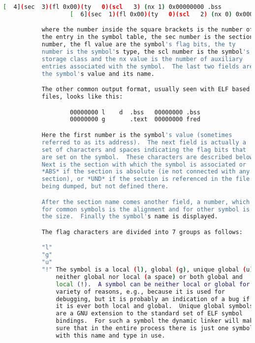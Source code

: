 {{\begin{lstlisting}[language=bash]
                   [  4](sec  3)(fl 0x00)(ty   0)(scl   3) (nx 1) 0x00000000 .bss
                   [  6](sec  1)(fl 0x00)(ty   0)(scl   2) (nx 0) 0x00000000 fred

           where the number inside the square brackets is the number of
           the entry in the symbol table, the sec number is the section
           number, the fl value are the symbol's flag bits, the ty
           number is the symbol's type, the scl number is the symbol's
           storage class and the nx value is the number of auxiliary
           entries associated with the symbol.  The last two fields are
           the symbol's value and its name.

           The other common output format, usually seen with ELF based
           files, looks like this:

                   00000000 l    d  .bss   00000000 .bss
                   00000000 g       .text  00000000 fred

           Here the first number is the symbol's value (sometimes
           referred to as its address).  The next field is actually a
           set of characters and spaces indicating the flag bits that
           are set on the symbol.  These characters are described below.
           Next is the section with which the symbol is associated or
           *ABS* if the section is absolute (ie not connected with any
           section), or *UND* if the section is referenced in the file
           being dumped, but not defined there.

           After the section name comes another field, a number, which
           for common symbols is the alignment and for other symbol is
           the size.  Finally the symbol's name is displayed.

           The flag characters are divided into 7 groups as follows:

           "l"
           "g"
           "u"
           "!" The symbol is a local (l), global (g), unique global (u),
               neither global nor local (a space) or both global and
               local (!).  A symbol can be neither local or global for a
               variety of reasons, e.g., because it is used for
               debugging, but it is probably an indication of a bug if
               it is ever both local and global.  Unique global symbols
               are a GNU extension to the standard set of ELF symbol
               bindings.  For such a symbol the dynamic linker will make
               sure that in the entire process there is just one symbol
               with this name and type in use.


\end{lstlisting}}}
